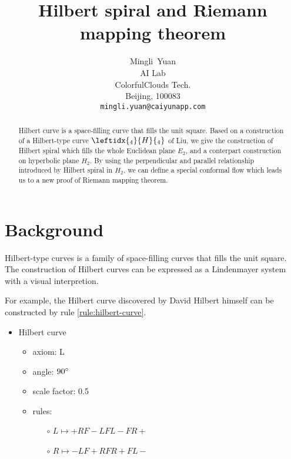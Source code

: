 \documentclass{article}
\title{Hilbert spiral and Riemann mapping theorem}
\author{
  Mingli~Yuan \\
  AI Lab \\
  ColorfulClouds Tech.\\
  Beijing, 100083 \\
  \texttt{mingli.yuan@caiyunapp.com} \\
}
\begin{document}
\maketitle

\begin{abstract}
    Hilbert curve is a space-filling curve that fills the unit square.
    Based on a construction of a Hilbert-type curve $\leftidx{_4}{H}{_4}$ of Liu,
    we give the construction of Hilbert spiral which fills the whole Euclidean plane $E_2$,
    and a conterpart construction on hyperbolic plane $H_2$.
    By using the perpendicular and parallel relationship introduced by Hilbert spiral in $H_2$,
    we can define a special conformal flow which leads us to a new proof of Riemann mapping theorem.
\end{abstract}


\setcounter{tocdepth}{2}
\tableofcontents

\section{Background}\label{sec:background}

Hilbert-type curves is a family of space-filling curves that fills the unit square.
The construction of Hilbert curves can be expressed as a Lindenmayer system with a visual interpretion.

For example, the Hilbert curve discovered by David Hilbert himself can be constructed by
rule \ref{rule:hilbert-curve}.

\begin{itemize}
    \label{rule:hilbert-curve}
    \item Hilbert curve
    \begin{itemize}
      \item axiom: L
      \item angle: $90\degree$
      \item scale factor: 0.5
      \item rules: \begin{itemize}
          \item[$\circ$] $L \mapsto +RF-LFL-FR+ $
          \item[$\circ$] $R \mapsto -LF+RFR+FL- $
      \end{itemize}
    \end{itemize}
\end{itemize}
\end{document}
